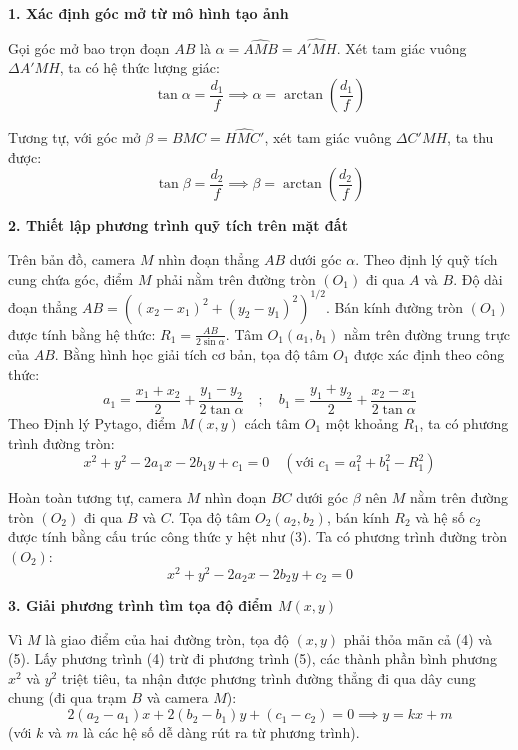 \textbf{1. Xác định góc mở từ mô hình tạo ảnh}

Gọi góc mở bao trọn đoạn $AB$ là $\alpha = \widehat{AMB} = \widehat{A'MH}$. Xét tam giác vuông $\Delta A'MH$, ta có hệ thức lượng giác:
\begin{equation}
    \tan \alpha = \frac{d_1}{f} \implies \alpha = \arctan\left(\frac{d_1}{f}\right)
\end{equation}

Tương tự, với góc mở $\beta = \widehat{BMC} = \widehat{HMC'}$, xét tam giác vuông $\Delta C'MH$, ta thu được:
\begin{equation}
    \tan \beta = \frac{d_2}{f} \implies \beta = \arctan\left(\frac{d_2}{f}\right)
\end{equation}

\textbf{2. Thiết lập phương trình quỹ tích trên mặt đất}

Trên bản đồ, camera $M$ nhìn đoạn thẳng $AB$ dưới góc $\alpha$. Theo định lý quỹ tích cung chứa góc, điểm $M$ phải nằm trên đường tròn $(O_1)$ đi qua $A$ và $B$. 
Độ dài đoạn thẳng $AB = \left((x_2-x_1)^2 + (y_2-y_1)^2\right)^{1/2}$. 
Bán kính đường tròn $(O_1)$ được tính bằng hệ thức: $R_1 = \frac{AB}{2\sin\alpha}$.
Tâm $O_1(a_1, b_1)$ nằm trên đường trung trực của $AB$. Bằng hình học giải tích cơ bản, tọa độ tâm $O_1$ được xác định theo công thức:
\begin{equation}
    a_1 = \frac{x_1 + x_2}{2} + \frac{y_1 - y_2}{2\tan\alpha} \quad ; \quad b_1 = \frac{y_1 + y_2}{2} + \frac{x_2 - x_1}{2\tan\alpha}
\end{equation}
Theo Định lý Pytago, điểm $M(x, y)$ cách tâm $O_1$ một khoảng $R_1$, ta có phương trình đường tròn:
\begin{equation}
    x^2 + y^2 - 2a_1 x - 2b_1 y + c_1 = 0 \quad (\text{với } c_1 = a_1^2 + b_1^2 - R_1^2)
\end{equation}

Hoàn toàn tương tự, camera $M$ nhìn đoạn $BC$ dưới góc $\beta$ nên $M$ nằm trên đường tròn $(O_2)$ đi qua $B$ và $C$. Tọa độ tâm $O_2(a_2, b_2)$, bán kính $R_2$ và hệ số $c_2$ được tính bằng cấu trúc công thức y hệt như (3). Ta có phương trình đường tròn $(O_2)$:
\begin{equation}
    x^2 + y^2 - 2a_2 x - 2b_2 y + c_2 = 0 
\end{equation}

\textbf{3. Giải phương trình tìm tọa độ điểm $M(x,y)$}

Vì $M$ là giao điểm của hai đường tròn, tọa độ $(x, y)$ phải thỏa mãn cả (4) và (5). 
Lấy phương trình (4) trừ đi phương trình (5), các thành phần bình phương $x^2$ và $y^2$ triệt tiêu, ta nhận được phương trình đường thẳng đi qua dây cung chung (đi qua trạm $B$ và camera $M$):
\begin{equation}
    2(a_2 - a_1)x + 2(b_2 - b_1)y + (c_1 - c_2) = 0 \implies y = kx + m
\end{equation}
(với $k$ và $m$ là các hệ số dễ dàng rút ra từ phương trình).

